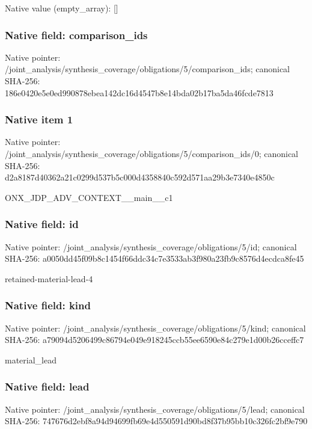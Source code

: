 \documentclass[10pt,a4paper]{article}
\begin{document}
Native value (empty\_\allowbreak{}array): []

\subsubsection{Native field: comparison\_\allowbreak{}ids}
Native pointer: /joint\_\allowbreak{}analysis/synthesis\_\allowbreak{}coverage/obligations/5/comparison\_\allowbreak{}ids; canonical SHA-256: 186e0420e5e0ed990878ebea142dc16d4547b8e14bda02b17ba5da46fcde7813

\subsubsection{Native item 1}
Native pointer: /joint\_\allowbreak{}analysis/synthesis\_\allowbreak{}coverage/obligations/5/comparison\_\allowbreak{}ids/0; canonical SHA-256: d2a8187d40362a21c0299d537b5c000d4358840c592d571aa29b3e7340e4850c

\begingroup\raggedright\sloppy ONX\_\allowbreak{}JDP\_\allowbreak{}ADV\_\allowbreak{}CONTEXT\_\allowbreak{}\_\allowbreak{}main\_\allowbreak{}\_\allowbreak{}c1\par\endgroup

\subsubsection{Native field: id}
Native pointer: /joint\_\allowbreak{}analysis/synthesis\_\allowbreak{}coverage/obligations/5/id; canonical SHA-256: a0050dd45f09b8c1454f66ddc34c7e3533ab3f980a23fb9c8576d4ecdca8fe45

\begingroup\raggedright\sloppy retained-material-lead-4\par\endgroup

\subsubsection{Native field: kind}
Native pointer: /joint\_\allowbreak{}analysis/synthesis\_\allowbreak{}coverage/obligations/5/kind; canonical SHA-256: a79094d5206499c86794e049e918245ccb55ee6590e84c279e1d00b26cceffc7

\begingroup\raggedright\sloppy material\_\allowbreak{}lead\par\endgroup

\subsubsection{Native field: lead}
Native pointer: /joint\_\allowbreak{}analysis/synthesis\_\allowbreak{}coverage/obligations/5/lead; canonical SHA-256: 747676d2ebf8a94d94699fb69e4d550591d90bd8f37b95bb10c326fc2bf9e790
\end{document}
